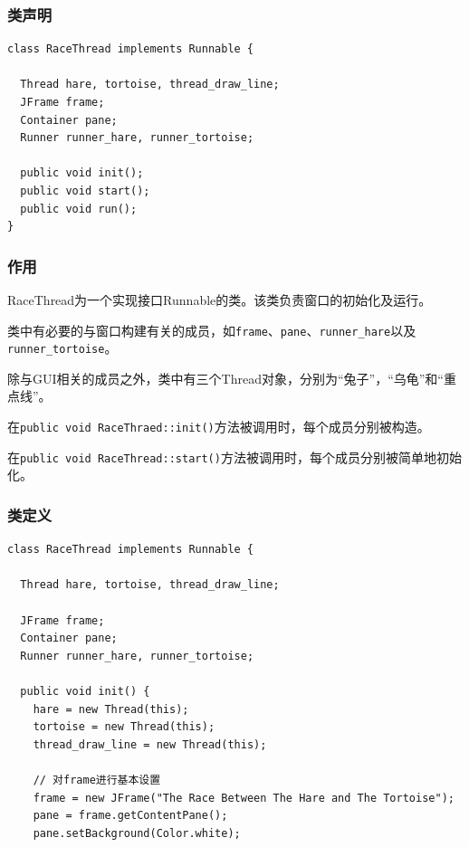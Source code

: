 \documentclass[11pt, a4paper]{article}
\begin{document}
\begin{CJK*}{UTF8}{gbsn}
  \subsubsection{类声明}
  \begin{lstlisting}
class RaceThread implements Runnable {
  
  Thread hare, tortoise, thread_draw_line;
  JFrame frame;
  Container pane;
  Runner runner_hare, runner_tortoise;
  
  public void init();
  public void start();
  public void run();
}
  \end{lstlisting}

  \subsubsection{作用}

  RaceThread为一个实现接口Runnable的类。该类负责窗口的初始化及运行。

  类中有必要的与窗口构建有关的成员，如\lstinline$frame$、\lstinline$pane$、\lstinline$runner_hare$以及\lstinline$runner_tortoise$。
  
  除与GUI相关的成员之外，类中有三个Thread对象，分别为“兔子”，“乌龟”和“重点线”。

  在\lstinline$public void RaceThraed::init()$方法被调用时，每个成员分别被构造。

  在\lstinline$public void RaceThread::start()$方法被调用时，每个成员分别被简单地初始化。
  
  \subsubsection{类定义}
  \begin{lstlisting}
class RaceThread implements Runnable {
  
  Thread hare, tortoise, thread_draw_line;

  JFrame frame;
  Container pane;
  Runner runner_hare, runner_tortoise;
  
  public void init() {
    hare = new Thread(this);
    tortoise = new Thread(this);
    thread_draw_line = new Thread(this);

    // 对frame进行基本设置
    frame = new JFrame("The Race Between The Hare and The Tortoise");
    pane = frame.getContentPane();
    pane.setBackground(Color.white);


\end{lstlisting}
\end{CJK*}
\end{document}
